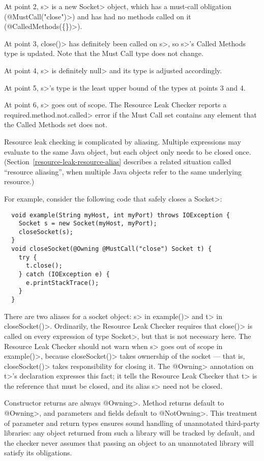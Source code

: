 At point 2, \<s> is a new \<Socket> object, which
has a must-call obligation (\<@MustCall("close")>)
and has had no methods called on it (\<@CalledMethods(\{\})>).

At point 3, \<close()> has definitely been called on \<s>, so
\<s>'s Called Methods type is updated. Note that the Must Call type
does not change.

At point 4, \<s> is definitely \<null> and its type is adjusted accordingly.

At point 5, \<s>'s type is the least upper bound of the types at points 3
and 4.

At point 6, \<s> goes out of scope.  The Resource Leak Checker reports a
\<required.method.not.called> error if the Must Call set contains any
element that the Called Methods set does not.



Resource leak checking is complicated by aliasing.  Multiple expressions
may evaluate to the same Java object, but each object only needs to be
closed once.  (Section~\ref{resource-leak-resource-alias} describes a
related situation called ``resource aliasing'', when multiple Java objects
refer to the same underlying resource.)

For example, consider the following code that safely closes a \<Socket>:

\begin{verbatim}
  void example(String myHost, int myPort) throws IOException {
    Socket s = new Socket(myHost, myPort);
    closeSocket(s);
  }
  void closeSocket(@Owning @MustCall("close") Socket t) {
    try {
      t.close();
    } catch (IOException e) {
      e.printStackTrace();
    }
  }
\end{verbatim}

There are two aliases for a socket object: \<s> in \<example()> and \<t> in
\<closeSocket()>.  Ordinarily, the Resource Leak Checker requires that
\<close()> is called on every expression of type \<Socket>, but that is not
necessary here.  The Resource Leak Checker should not warn when
\<s> goes out of scope in \<example()>, because \<closeSocket()> takes ownership
of the socket --- that is, \<closeSocket()> takes responsibility for closing
it. The \<@Owning> annotation on \<t>'s declaration expresses this fact; it
tells the Resource Leak Checker that \<t> is the reference that must be
closed, and its alias \<s> need not be closed.

Constructor returns are always \<@Owning>.
Method returns default to \<@Owning>,
and parameters and fields default to \<@NotOwning>. This treatment of parameter and
return types ensures sound handling of unannotated third-party libraries: any
object returned from such a library will be tracked by default, and the checker
never assumes that passing an object to an unannotated library will satisfy its obligations.

